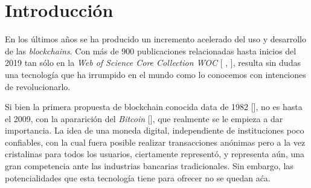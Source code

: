 \chapter*{Introducción}\label{chapter:introduction}

En los \'ultimos a\~nos se ha producido un incremento acelerado del uso y desarrollo de las \emph{blockchains}. Con m\'as de 900 publicaciones relacionadas hasta inicios del 2019 tan s\'olo en la \emph{Web of Science Core Collection WOC} [\cite{xu2019systematic} , \cite{yli2016current}], resulta sin dudas una tecnolog\'ia que ha irrumpido en el mundo como lo conocemos con intenciones de revolucionarlo. %

Si bien la primera propuesta de blockchain conocida data de 1982 [\cite{chaum1979computer}], no es hasta el 2009, con la apararici\'on del \emph{Bitcoin} [\cite{nakamoto2008bitcoin}], que realmente se le empieza a dar importancia. La idea de una moneda digital, independiente de instituciones poco confiables, con la cual fuera posible realizar transacciones an\'onimas pero a la vez cristalinas para todos los usuarios, ciertamente represent\'o, y representa a\'un, una gran competencia ante las industrias bancarias tradicionales. Sin embargo, las potencialidades que esta tecnolog\'ia tiene para ofrecer no se quedan a\'ca. %




